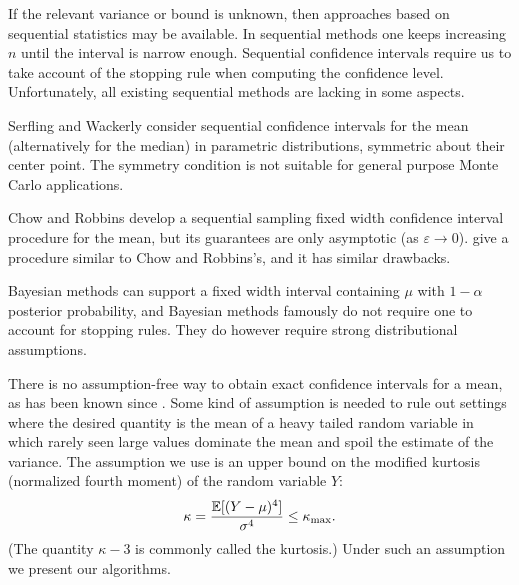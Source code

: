 \documentclass{iitthesis}
\theoremstyle{definition}
\begin{document}
If the relevant variance or bound is unknown, then approaches based on sequential statistics \cite{Siegmund85} may be available.  In sequential methods one keeps increasing $n$ until the interval is narrow enough. Sequential confidence intervals require us to take account of the stopping rule when computing the confidence level. Unfortunately, all existing sequential methods are lacking in some aspects. 

Serfling and Wackerly \cite{SerflingaWackerlyb76} consider sequential confidence intervals for the mean (alternatively for the median) in parametric distributions, symmetric about their center point. The symmetry condition is not suitable for general
purpose Monte Carlo applications.

Chow and Robbins\cite{ChowRobbins65} develop a sequential sampling fixed width confidence interval procedure for the mean, but its guarantees are only asymptotic (as $\varepsilon \to 0$). \cite{MukhDatta96} give a procedure similar to Chow and Robbins's, and it has similar drawbacks.

Bayesian methods can support a fixed width interval containing $\mu$ with $1-\alpha$ posterior probability, and
Bayesian methods famously do not require one to account for stopping rules. They do however require strong distributional assumptions.

There is no assumption-free way to obtain exact confidence intervals for a mean, as has been known since \cite{BahadurSavage56}. Some kind of assumption is needed to rule out settings where the desired quantity is the mean of a heavy tailed random variable in which rarely seen large values dominate the mean and spoil the estimate of the variance. The assumption we use is an upper bound on the modified kurtosis (normalized fourth moment) of the random variable $Y$:
\begin{equation} \label{def:boundedkurtosis}
\kappa = \frac{\mathbb{E}[(Y-\mu)^4]}{\sigma^4} \le \kappa_{\max}.
\end{equation}
(The quantity $\kappa-3$ is commonly called the kurtosis.)  Under such an assumption we present our algorithms.

\end{document}
